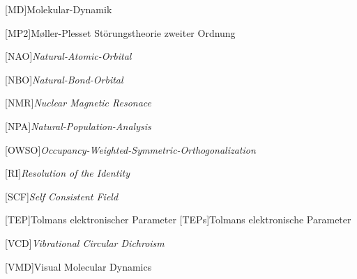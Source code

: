 \begin{acronym}[SEPSEP]
	[MD]{Molekular-Dynamik}
	
	[MP2]{M\o ller-Plesset Störungstheorie zweiter Ordnung}
		
    [NAO]{\textit{Natural-Atomic-Orbital}}

    [NBO]{\textit{Natural-Bond-Orbital}}
    
    [NMR]{\textit{Nuclear Magnetic Resonace}}
        
    [NPA]{\textit{Natural-Population-Analysis}}
    
    [OWSO]{\textit{Occupancy-Weighted-Symmetric-Orthogonalization}}
    
    [RI]{\textit{Resolution of the Identity}}
    
	[SCF]{\textit{Self Consistent Field}}   

	[TEP]{Tolmans elektronischer Parameter}   
		{Tolmans elektronische Parameter}
		
	[VCD]{\textit{Vibrational Circular Dichroism}}

    

        
    [VMD]{Visual Molecular Dynamics}
\end{acronym}